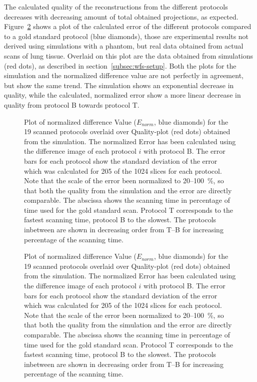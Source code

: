 The calculated quality of the reconstructions from the different protocols decreases with decreasing amount of total obtained projections, as expected. Figure~\ref{fig:NormalizedErrorPlot} shows a plot of the calculated error of the different protocols compared to a gold standard protocol (blue diamonds), those are experimental results not derived using simulations with a phantom, but real data obtained from actual scans of lung tissue. Overlaid on this plot are the data obtained from simulations (red dots), as described in section~\ref{subsec:wfs-setup}. Both the plots for the simulation and the normalized difference value are not perfectly in agreement, but show the same trend. The simulation shows an exponential decrease in quality, while the calculated, normalized error show a more linear decrease in quality from protocol B towards protocol T.

\ifiucr
	\begin{figure}%
		\centering%
		\caption{%
			Plot of normalized difference Value ($E_{norm}$, blue diamonds) for the 19 scanned protocols overlaid over Quality-plot (red dots) obtained from the simulation. The normalized Error has been calculated using the difference image of each protocol $i$ with protocol B. The error bars for each protocol show the standard deviation of the error which was calculated for 205 of the 1024 slices for each protocol. Note that the scale of the error been normalized to 20--\SI{100}{\percent}, so that both the quality from the simulation and the error are directly comparable. The abscissa shows the scanning time in percentage of time used for the gold standard scan. Protocol T corresponds to the fastest scanning time, protocol B to the slowest. The protocols inbetween are shown in decreasing order from T--B for increasing percentage of the scanning time.%
		}%
		\label{fig:NormalizedErrorPlot}%
	\end{figure}%
\else
	\begin{figure}[htp]
		\centering
		
		\caption{%
		Plot of normalized difference Value ($E_{norm}$, blue diamonds) for the 19 scanned protocols overlaid over Quality-plot (red dots) obtained from the simulation. The normalized Error has been calculated using the difference image of each protocol $i$ with protocol B. The error bars for each protocol show the standard deviation of the error which was calculated for 205 of the 1024 slices for each protocol. Note that the scale of the error been normalized to 20--\SI{100}{\percent}, so that both the quality from the simulation and the error are directly comparable. The abscissa shows the scanning time in percentage of time used for the gold standard scan. Protocol T corresponds to the fastest scanning time, protocol B to the slowest. The protocols inbetween are shown in decreasing order from T--B for increasing percentage of the scanning time.%
		}%
		\label{fig:NormalizedErrorPlot}
	\end{figure}
\fi

